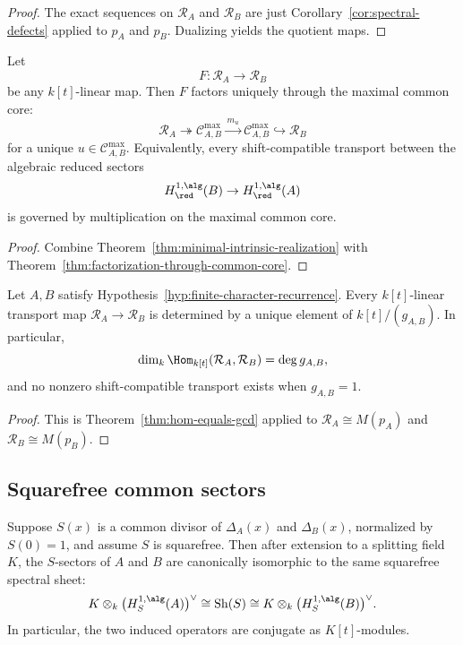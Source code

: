 \begin{proof}
The exact sequences on \(\mathcal R_A\) and \(\mathcal R_B\) are just Corollary~\ref{cor:spectral-defects}
applied to \(p_A\) and \(p_B\).
Dualizing yields the quotient maps.
\end{proof}

\begin{proposition}
\label{prop:transport-factors-through-common-core}
Let
\[
F\colon \mathcal R_A\to \mathcal R_B
\]
be any \(k[t]\)-linear map.
Then \(F\) factors uniquely through the maximal common core:
\[
\mathcal R_A\twoheadrightarrow \mathcal C^{\max}_{A,B}\xrightarrow{\,m_u\,}\mathcal C^{\max}_{A,B}\hookrightarrow \mathcal R_B
\]
for a unique \(u\in \mathcal C^{\max}_{A,B}\).
Equivalently, every shift-compatible transport between the algebraic reduced sectors
\[
H^{1,\alg}_{\red}(B)\to H^{1,\alg}_{\red}(A)
\]
is governed by multiplication on the maximal common core.
\end{proposition}

\begin{proof}
Combine Theorem~\ref{thm:minimal-intrinsic-realization} with
Theorem~\ref{thm:factorization-through-common-core}.
\end{proof}

\begin{corollary}
\label{cor:gcd-bound-transport}
Let \(A,B\) satisfy Hypothesis~\ref{hyp:finite-character-recurrence}.
Every \(k[t]\)-linear transport map \(\mathcal R_A\to \mathcal R_B\) is
determined by a unique element of \(k[t]/(g_{A,B})\).
In particular,
\[
\dim_k\Hom_{k[t]}(\mathcal R_A,\mathcal R_B)=\deg g_{A,B},
\]
and no nonzero shift-compatible transport exists when \(g_{A,B}=1\).
\end{corollary}

\begin{proof}
This is Theorem~\ref{thm:hom-equals-gcd} applied to
\(\mathcal R_A\cong M(p_A)\) and \(\mathcal R_B\cong M(p_B)\).
\end{proof}

\subsection{Squarefree common sectors}

\begin{proposition}
\label{prop:squarefree-common-sector}
Suppose \(S(x)\) is a common divisor of \(\Delta_A(x)\) and \(\Delta_B(x)\), normalized by \(S(0)=1\), and assume \(S\) is squarefree.
Then after extension to a splitting field \(K\), the \(S\)-sectors of \(A\) and \(B\) are canonically isomorphic to the same squarefree spectral sheet:
\[
K\otimes_k \bigl(H^{1,\alg}_S(A)\bigr)^\vee
\cong \operatorname{Sh}(S)
\cong K\otimes_k \bigl(H^{1,\alg}_S(B)\bigr)^\vee.
\]
In particular, the two induced operators are conjugate as \(K[t]\)-modules.
\end{proposition}

